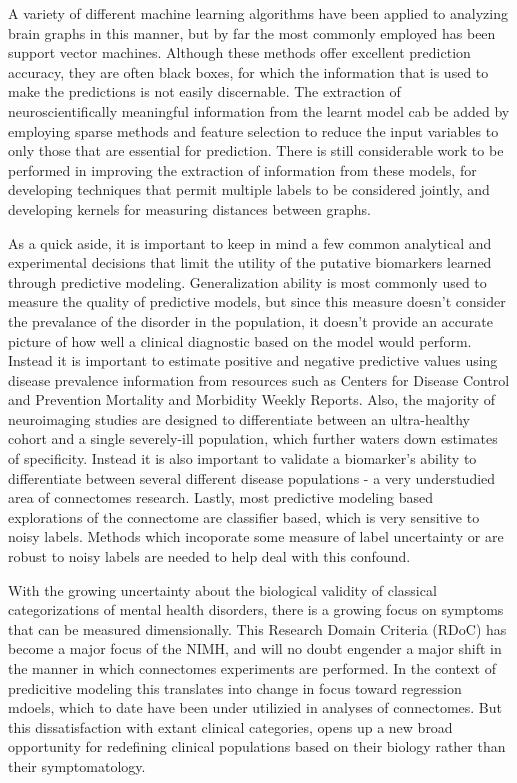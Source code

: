 A variety of different machine learning algorithms have been applied to analyzing brain graphs in this manner,
but by far the most commonly employed has been support vector machines\cite{DiMartino}. Although these methods 
offer excellent prediction accuracy, they are often black boxes, for which the information that is used to make the
predictions is not easily discernable. The extraction of neuroscientifically
meaningful information from the learnt model cab be added by employing sparse methods and feature
selection to reduce the input variables to only those that are
essential for prediction.  There is still considerable work to be performed in
improving the extraction of information from these models, for developing
techniques that permit multiple labels to be considered jointly, and developing
kernels for measuring distances between graphs.


As a quick aside, it is important to keep in mind a few common analytical and experimental decisions that 
limit the utility of the putative biomarkers learned through predictive modeling. Generalization ability is
most commonly used to measure the quality of predictive models, but since this measure doesn't consider the
prevalance of the disorder in the population, it doesn't provide an accurate picture of how well a clinical 
diagnostic based on the model would perform. Instead it is important to estimate positive and negative predictive 
values \cite{Grimes, Altman} using disease prevalence information from resources such as Centers for Disease Control and 
Prevention Mortality and Morbidity Weekly Reports. Also, the majority of neuroimaging studies are designed to 
differentiate between an ultra-healthy cohort and a single severely-ill population, which further waters down
estimates of specificity. Instead it is also important to validate a biomarker's ability to differentiate between
several different disease populations - a very understudied area of connectomes research. Lastly, most predictive
modeling based explorations of the connectome are classifier based, which is very sensitive to noisy labels. Methods 
which incoporate some measure of label uncertainty or are robust to noisy labels are needed to help deal with this confound.


With the growing uncertainty about the biological validity of classical categorizations
of mental health disorders, there is a growing focus on symptoms that can be measured dimensionally. This 
Research Domain Criteria (RDoC) has become a major focus of the NIMH, and will no doubt engender a major shift in the 
manner in which connectomes experiments are performed. In the context of predicitive modeling this translates into change in
focus toward regression mdoels, which to date have been under utilizied in analyses of connectomes. But this dissatisfaction
with extant clinical categories, opens up a new broad opportunity for redefining clinical populations based on their 
biology rather than their symptomatology.



